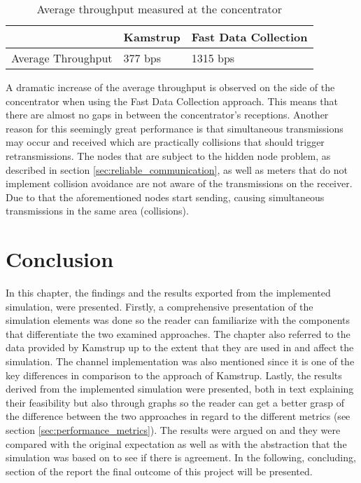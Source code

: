 \begin{table}[H]
\begin{center}
    \begin{tabular}{ | l | l | l | }
    \hline
    & Kamstrup & Fast Data Collection \\ \hline
    Average Throughput & 377 bps & 1315 bps \\ \hline
    \end{tabular}
\end{center}
\caption{Average throughput measured at the concentrator}
\label{tab:average_throuput}
\end{table}

A dramatic increase of the average throughput is observed on the side of the concentrator when using the Fast Data Collection approach. This means that there are almost no gaps in between the concentrator's receptions. Another reason for this seemingly great performance is that simultaneous transmissions may occur and received which are practically collisions that should trigger retransmissions. The nodes that are subject to the hidden node problem, as described in section \ref{sec:reliable_communication}, as well as meters that do not implement collision avoidance are not aware of the transmissions on the receiver. Due to that the aforementioned nodes start sending, causing simultaneous transmissions in the same area (collisions).

\section{Conclusion}
In this chapter, the findings and the results exported from the implemented simulation, were presented. Firstly, a comprehensive presentation of the simulation elements was done so the reader can familiarize with the components that differentiate the two examined approaches. The chapter also referred to the data provided by Kamstrup up to the extent that they are used in and affect the simulation. The channel implementation was also mentioned since it is one of the key differences in comparison to the approach of Kamstrup. Lastly, the results derived from the implemented simulation were presented, both in text explaining their feasibility but also through graphs so the reader can get a better grasp of the difference between the two approaches in regard to the different metrics (see section \ref{sec:performance_metrics}). The results were argued on and they were compared with the original expectation as well as with the abstraction that the simulation was based on to see if there is agreement.
In the following, concluding, section of the report the final outcome of this project will be presented.



